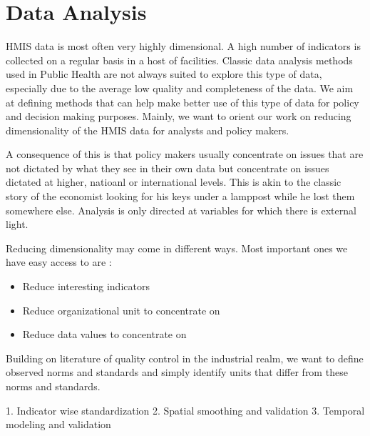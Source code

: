 \documentclass[a4paper,11pt,final,twoside]{article}
\begin{document}
\section{Data Analysis}

HMIS data is most often very highly dimensional. A high number of indicators is collected on a regular basis in a host of facilities. Classic data analysis methods used in Public Health are not always suited to explore this type of data, especially due to the average low quality and completeness of the data. We aim at defining methods that can help make better use of this type of data for policy and decision making purposes. Mainly, we want to orient our work on reducing dimensionality of the HMIS data for analysts and policy makers.

A consequence of this is that policy makers usually concentrate on issues that are not dictated by what they see in their own data but concentrate on issues dictated at higher, natioanl or international levels. This is akin to the classic story of the economist looking for his keys under a lamppost while he lost them somewhere else. Analysis is only directed at variables for which there is external light.

Reducing dimensionality may come in different ways. Most important ones we have easy access to are :

\begin{itemize}
\item Reduce interesting indicators
\item Reduce organizational unit to concentrate on
\item Reduce data values to concentrate on
\end{itemize}

Building on literature of quality control in the industrial realm, we want to define observed norms and standards and simply identify units that differ from these norms and standards.


1. Indicator wise standardization
2. Spatial smoothing and validation
3. Temporal modeling and validation
\end{document}
